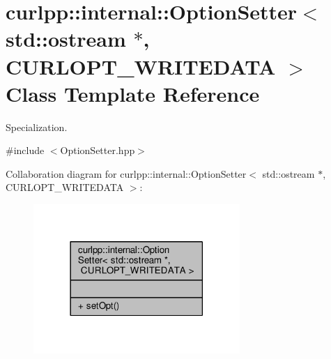 \hypertarget{classcurlpp_1_1internal_1_1OptionSetter_3_01std_1_1ostream_01_5_00_01CURLOPT__WRITEDATA_01_4}{\section{curlpp\-:\-:internal\-:\-:Option\-Setter$<$ std\-:\-:ostream $\ast$, C\-U\-R\-L\-O\-P\-T\-\_\-\-W\-R\-I\-T\-E\-D\-A\-T\-A $>$ Class Template Reference}
\label{classcurlpp_1_1internal_1_1OptionSetter_3_01std_1_1ostream_01_5_00_01CURLOPT__WRITEDATA_01_4}
}


Specialization.  




{\ttfamily \#include $<$Option\-Setter.\-hpp$>$}



Collaboration diagram for curlpp\-:\-:internal\-:\-:Option\-Setter$<$ std\-:\-:ostream $\ast$, C\-U\-R\-L\-O\-P\-T\-\_\-\-W\-R\-I\-T\-E\-D\-A\-T\-A $>$\-:
\nopagebreak
\begin{figure}[H]
\begin{center}
\leavevmode
\includegraphics[width=222pt]{classcurlpp_1_1internal_1_1OptionSetter_3_01std_1_1ostream_01_5_00_01CURLOPT__WRITEDATA_01_4__coll__graph}
\end{center}
\end{figure}
